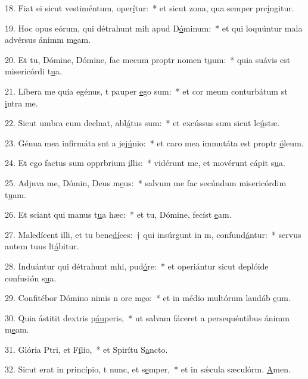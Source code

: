 18. Fiat ei sicut vestiméntum,  oper\uline{í}tur:~* et sicut zona, qua semper prc\uline{í}ngitur.\par 
19. Hoc opus eórum, qui détrahunt mih apud D\uline{ó}minum:~* et qui loquúntur mala advérsus ánimm m\uline{e}am.\par 
20. Et tu, Dómine, Dómine, fac mecum proptr nomen t\uline{u}um:~* quia suávis est misericórdi t\uline{u}a.\par 
21. Líbera me quia egénus, t pauper \uline{e}go sum:~* et cor meum conturbátum st \uline{i}ntra me.\par 
22. Sicut umbra cum declnat, abl\uline{á}tus sum:~* et excússus sum sicut lc\uline{ú}stæ.\par 
23. Génua mea infirmáta snt a jej\uline{ú}nio:~* et caro mea immutáta est proptr \uline{ó}leum.\par 
24. Et ego factus sum opprbrium \uline{i}llis:~* vidérunt me, et movérunt cápit s\uline{u}a.\par 
25. Adjuva me, Dómin, Deus m\uline{e}us:~* salvum me fac secúndum misericórdim t\uline{u}am.\par 
26. Et sciant qui manus t\uline{u}a hæc:~* et tu, Dómine, fecíst \uline{e}am.\par 
27. Maledícent illi, et tu bene\uline{dí}ces:~† qui insúrgunt in m, confund\uline{á}ntur:~* servus autem tuus lt\uline{á}bitur.\par 
28. Induántur qui détrahunt mhi, pud\uline{ó}re:~* et operiántur sicut deplóide confusión s\uline{u}a.\par 
29. Confitébor Dómino nimis n ore m\uline{e}o:~* et in médio multórum laudáb \uline{e}um.\par 
30. Quia ástitit  dextris p\uline{áu}peris,~* ut salvam fáceret a persequéntibus ánimm m\uline{e}am.\par 
31. Glória Ptri, et F\uline{í}lio,~* et Spirítu S\uline{a}ncto.\par 
32. Sicut erat in princípio, t nunc, et s\uline{e}mper,~* et in sǽcula sæculórm. \uline{A}men.\par 
